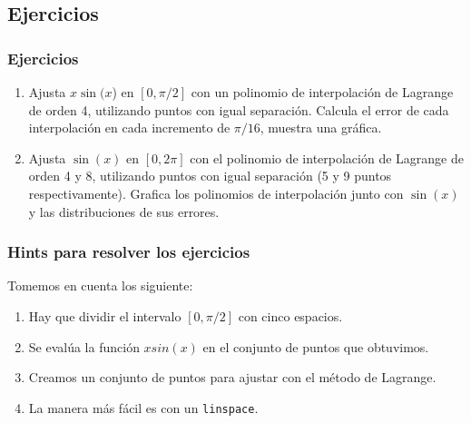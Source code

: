 \subsection{Ejercicios}
\begin{frame}
\frametitle{Ejercicios}
\begin{enumerate}
\item Ajusta $x \sin(x$) en $[0, \pi/2]$ con un polinomio de interpolación de Lagrange de orden 4, utilizando puntos con igual separación. Calcula el error de cada interpolación en cada incremento de $\pi/16$, muestra una gráfica.
\item Ajusta $\sin(x)$ en $[0, 2\pi]$ con el polinomio de interpolación de Lagrange de orden 4 y 8, utilizando puntos con igual separación (5 y 9 puntos respectivamente). Grafica los polinomios de interpolación junto con $\sin(x)$ y las distribuciones de sus errores.
\end{enumerate}
\end{frame}
\begin{frame}[fragile]
\frametitle{Hints para resolver los ejercicios}
Tomemos en cuenta los siguiente:
\begin{enumerate}[<+->]
\item Hay que dividir el intervalo $[0,\pi/2]$ con cinco espacios.
\item Se evalúa la función $xsin(x)$ en el conjunto de puntos que obtuvimos.
\item Creamos un conjunto de puntos para ajustar con el método de Lagrange.
\item La manera más fácil es con un \texttt{linspace}.
\end{enumerate}
\end{frame}
